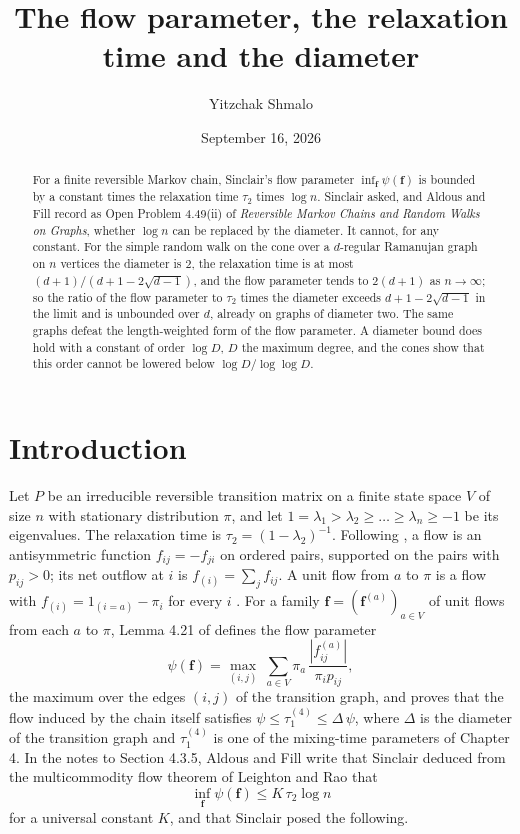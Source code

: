 \documentclass[11pt]{amsart}
\title[The flow parameter, the relaxation time and the diameter]{The flow parameter, the relaxation time and the diameter}
\author{Yitzchak Shmalo}
\date{September 16, 2026}
\theoremstyle{definition}
\newcommand{\bfF}{\mathbf{f}}
\begin{document}
\begin{abstract}
For a finite reversible Markov chain, Sinclair's flow parameter $\inf_{\bfF}\psi(\bfF)$ is bounded by a constant times the relaxation time $\tau_2$ times $\log n$. Sinclair asked, and Aldous and Fill record as Open Problem 4.49(ii) of \emph{Reversible Markov Chains and Random Walks on Graphs}, whether $\log n$ can be replaced by the diameter. It cannot, for any constant. For the simple random walk on the cone over a $d$-regular Ramanujan graph on $n$ vertices the diameter is $2$, the relaxation time is at most $(d+1)/(d+1-2\sqrt{d-1})$, and the flow parameter tends to $2(d+1)$ as $n\to\infty$; so the ratio of the flow parameter to $\tau_2$ times the diameter exceeds $d+1-2\sqrt{d-1}$ in the limit and is unbounded over $d$, already on graphs of diameter two. The same graphs defeat the length-weighted form of the flow parameter. A diameter bound does hold with a constant of order $\log D$, $D$ the maximum degree, and the cones show that this order cannot be lowered below $\log D/\log\log D$.
\end{abstract}

\maketitle

\section{Introduction}

Let $P$ be an irreducible reversible transition matrix on a finite state space $V$ of size $n$ with stationary distribution $\pi$, and let $1=\lambda_1>\lambda_2\ge\dots\ge\lambda_n\ge-1$ be its eigenvalues. The relaxation time is $\tau_2=(1-\lambda_2)^{-1}$. Following \cite[Chapter~3]{AF}, a flow is an antisymmetric function $f_{ij}=-f_{ji}$ on ordered pairs, supported on the pairs with $p_{ij}>0$; its net outflow at $i$ is $f_{(i)}=\sum_jf_{ij}$. A unit flow from $a$ to $\pi$ is a flow with $f_{(i)}=1_{(i=a)}-\pi_i$ for every $i$ \cite[(3.98)]{AF}. For a family $\bfF=(\bfF^{(a)})_{a\in V}$ of unit flows from each $a$ to $\pi$, Lemma 4.21 of \cite{AF} defines the flow parameter
\begin{equation}\label{eq:psi}
\psi(\bfF)=\max_{(i,j)}\ \sum_{a\in V}\pi_a\,\frac{|f^{(a)}_{ij}|}{\pi_ip_{ij}},
\end{equation}
the maximum over the edges $(i,j)$ of the transition graph, and proves that the flow induced by the chain itself satisfies $\psi\le\tau_1^{(4)}\le\Delta\,\psi$, where $\Delta$ is the diameter of the transition graph and $\tau_1^{(4)}$ is one of the mixing-time parameters of Chapter 4. In the notes to Section 4.3.5, Aldous and Fill write that Sinclair \cite{Sinclair} deduced from the multicommodity flow theorem of Leighton and Rao \cite{LR} that
\begin{equation}\label{eq:449}
\inf_{\bfF}\psi(\bfF)\le K\,\tau_2\log n
\end{equation}
for a universal constant $K$, and that Sinclair posed the following.
\end{document}
